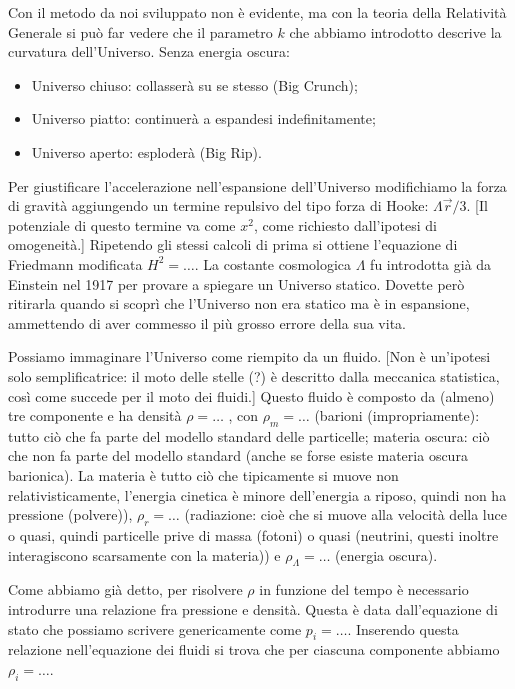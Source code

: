 \documentclass[10pt,a4paper,fleqn,draft]{article}
\begin{document}
Con il metodo da noi sviluppato non è evidente, ma con la teoria della
Relatività Generale si può far vedere che il parametro $k$ che abbiamo
introdotto descrive la curvatura dell'Universo. Senza energia oscura:
\begin{itemize}
\item Universo chiuso: collasserà su se stesso (Big Crunch);
\item Universo piatto: continuerà a espandesi indefinitamente;
\item Universo aperto: esploderà (Big Rip).
\end{itemize}

Per giustificare l'accelerazione nell'espansione dell'Universo modifichiamo la
forza di gravità aggiungendo un termine repulsivo del tipo forza di Hooke:
$\Lambda \vec{r}/3$. [Il potenziale di questo termine va come $x^2$, come
richiesto dall'ipotesi di omogeneità.] Ripetendo gli stessi calcoli di prima si
ottiene l'equazione di Friedmann modificata $H^2 = \dots$. La costante
cosmologica $\Lambda$ fu introdotta già da Einstein nel 1917 per provare a
spiegare un Universo statico. Dovette però ritirarla quando si scoprì che
l'Universo non era statico ma è in espansione, ammettendo di aver commesso il
più grosso errore della sua vita.

Possiamo immaginare l'Universo come riempito da un fluido. [Non è un'ipotesi
solo semplificatrice: il moto delle stelle (?) è descritto dalla meccanica
statistica, così come succede per il moto dei fluidi.] Questo fluido è composto
da (almeno) tre componente e ha densità $\rho = \dots$ , con $\rho_m = \dots$
(barioni (impropriamente): tutto ciò che fa parte del modello standard delle
particelle; materia oscura: ciò che non fa parte del modello standard (anche se
forse esiste materia oscura barionica). La materia è tutto ciò che tipicamente
si muove non relativisticamente, l'energia cinetica è minore dell'energia a
riposo, quindi non ha pressione (polvere)), $\rho_r = \dots$ (radiazione: cioè
che si muove alla velocità della luce o quasi, quindi particelle prive di massa
(fotoni) o quasi (neutrini, questi inoltre interagiscono scarsamente con la
materia)) e $\rho_\Lambda = \dots$ (energia oscura).

Come abbiamo già detto, per risolvere $\rho$ in funzione del tempo è necessario
introdurre una relazione fra pressione e densità. Questa è data dall'equazione
di stato che possiamo scrivere genericamente come $p_i = \dots$. Inserendo
questa relazione nell'equazione dei fluidi si trova che per ciascuna componente
abbiamo $\rho_i = \dots$.
\end{document}
